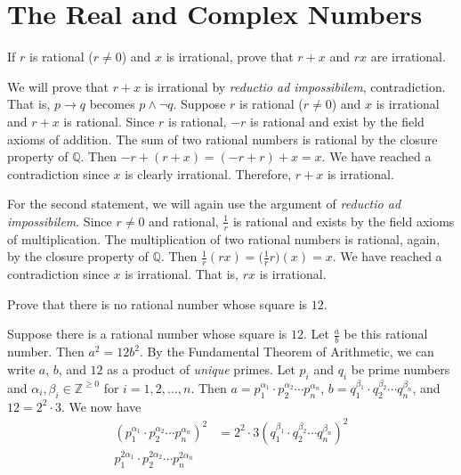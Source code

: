 \chapter{The Real and Complex Numbers}
\label{ch1}

\begin{exercise}
\item
  If \(r\) is rational (\(r\neq 0\)) and \(x\) is irrational, prove that
  \(r + x\) and \(rx\) are irrational.
  \par\smallskip
  We will prove that \(r + x\) is irrational by
  \textit{reductio ad impossibilem}, contradiction.
  That is, \(p\to q\) becomes \(p\wedge\neg q\).
  Suppose \(r\) is rational (\(r\neq 0\)) and \(x\) is irrational and
  \(r + x\) is rational.
  Since \(r\) is rational, \(-r\) is rational and exist by the field axioms of
  addition.
  The sum of two rational numbers is rational by the closure property of
  \(\mathbb{Q}\).
  Then \(-r + (r + x) = (-r + r) + x = x\).
  We have reached a contradiction since \(x\) is clearly irrational.
  Therefore, \(r + x\) is irrational.
  \par\smallskip
  For the second statement, we will again use the argument of
  \textit{reductio ad impossibilem}.
  Since \(r\neq 0\) and rational, \(\frac{1}{r}\) is rational and exists by the
  field axioms of multiplication.
  The multiplication of two rational numbers is rational, again, by the
  closure property of \(\mathbb{Q}\).
  Then \(\frac{1}{r}(rx) = \bigl(\frac{1}{r}r\bigr)(x) = x\).
  We have reached a contradiction since \(x\) is irrational.
  That is, \(rx\) is irrational.
\item
  Prove that there is no rational number whose square is \(12\).
  \par\smallskip
  Suppose there is a rational number whose square is \(12\).
  Let \(\frac{a}{b}\) be this rational number.
  Then \(a^2 = 12b^2\).
  By the Fundamental Theorem of Arithmetic, we can write \(a\), \(b\), and
  \(12\) as a product of \textit{unique} primes.
  Let \(p_i\) and \(q_i\) be prime numbers and
  \(\alpha_i, \beta_i\in\mathbb{Z}^{\geq 0}\) for \(i = 1, 2, \ldots, n\).
  Then \(a = p_1^{\alpha_1}\cdot p_2^{\alpha_2}\cdots p_n^{\alpha_n}\),
  \(b = q_1^{\beta_1}\cdot q_2^{\beta_2}\cdots q_n^{\beta_n}\), and
  \(12 = 2^2\cdot 3\).
  We now have
  \begin{align*}
    (p_1^{\alpha_1}\cdot p_2^{\alpha_2}\cdots p_n^{\alpha_n})^2
    &= 2^2\cdot 3(q_1^{\beta_1}\cdot q_2^{\beta_2}\cdots q_n^{\beta_n})^2\\
    p_1^{2\alpha_1}\cdot p_2^{2\alpha_2}\cdots p_n^{2\alpha_n}

\end{align*}
\end{exercise}
